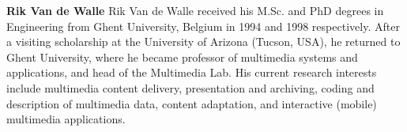 \documentclass[twocolumn]{article}
\begin{document}
\vspace{4mm}

\textbf{Rik Van de Walle}
Rik Van de Walle received his M.Sc. and PhD degrees in Engineering from Ghent University, Belgium in 1994 and 1998 respectively. After a visiting scholarship at the University of Arizona (Tucson, USA), he returned to Ghent University, where he became professor of multimedia systems and applications, and head of the Multimedia Lab. His current research interests include multimedia content delivery, presentation and archiving, coding and description of multimedia data, content adaptation, and interactive (mobile) multimedia applications.
\end{document}
